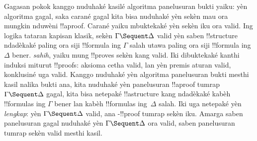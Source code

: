 \documentclass[../../../include/open-logic-section]{subfiles}
\begin{document}
Gagasan pokok kanggo nuduhaké kasilé algoritma
panelusuran bukti yaiku: yèn algoritma gagal, saka
carané gagal kita bisa nuduhaké yèn sekèn mau ora
mungkin nduwèni !!a{proof}. Carané yaiku mbuktekaké
yèn sekèn iku ora valid. Ing logika tataran kapisan
klasik, sekèn $\Gamma \Sequent \Delta$ valid yèn
saben !!{structure} ndadèkaké paling ora siji
!!{formula} ing $\Gamma$ salah utawa paling ora
siji !!{formula} ing~$\Delta$ bener. 
\emph{sahih}, yaiku mung !!{prove}s sekèn kang valid.
Iki dibuktekaké kanthi induksi miturut !!{proof}s:
aksioma cetha valid, lan yèn premis aturan valid,
konklusiné uga valid. Kanggo nuduhaké yèn algoritma
panelusuran bukti mesthi kasil nalika bukti ana,
kita nuduhaké yèn panelusuran !!a{proof} tumrap
$\Gamma \Sequent \Delta$ gagal, kita bisa netepaké
!!a{structure} kang ndadèkaké kabèh !!{formula}s
ing $\Gamma$ bener lan kabèh !!{formula}s ing~$\Delta$
salah. Iki uga netepaké yèn 
\emph{lengkap}: yèn $\Gamma \Sequent \Delta$ valid,
ana -!!{proof} tumrap sekèn iku.
Amarga saben panelusuran gagal nuduhaké yèn
$\Gamma \Sequent \Delta$ ora valid, saben panelusuran
tumrap sekèn valid mesthi kasil.
\end{document}
